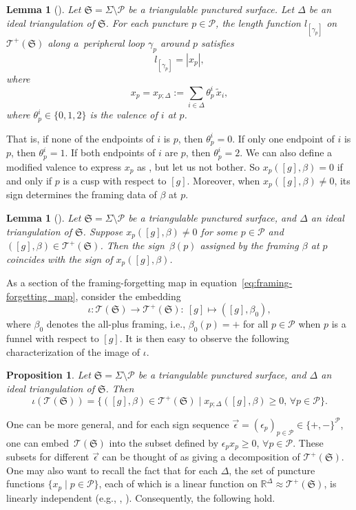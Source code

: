 \documentclass[pdftex]{sigma}
\numberwithin{equation}{section}
\newtheorem{Lemma}[Theorem]{Lemma}
\newtheorem{Proposition}[Theorem]{Proposition}
\theoremstyle{definition}
\newcommand{\til}[1]{\widetilde{#1}}
\begin{document}
\begin{Lemma}[\cite{CF, FG07}]
\label{lem:puncture_function_as_sum}
Let $\mathfrak{S} = \Sigma \setminus \mathcal{P}$ be a triangulable punctured surface. Let $\Delta$ be an ideal triangulation of $\mathfrak{S}$. For each puncture $p \in \mathcal{P}$, the length function $l_{[\gamma_p]}$ on $\mathscr{T}^+(\mathfrak{S})$ along a~peripheral loop $\gamma_p$ around $p$ satisfies
\[
l_{[\gamma_p]} = \left| x_p \right|,
\]
where
\[
x_p = x_{p;\Delta} := \sum_{i \in \Delta} \theta^i_p \, \til{x}_i,
\]
where $\theta_p^i \in \{0,1,2\}$ is the valence of $i$ at $p$.
\end{Lemma}
That is, if none of the endpoints of $i$ is $p$, then $\theta_p^i=0$. If only one endpoint of $i$ is $p$, then $\theta_p^i=1$. If both endpoints of $i$ are $p$, then $\theta_p^i=2$. We can also define a modified valence \smash{$\til{\theta}^i_p$} to express $x_p$ as \smash{$\sum_{i\in \Delta} \til{\theta}^i_p \, x_i$}, but let us not bother. So $x_p([g],\beta) =0$ if and only if $p$ is a cusp with respect to $[g]$. Moreover, when $x_p([g],\beta) \neq 0$, its sign determines the framing data of $\beta$ at $p$.
\begin{Lemma}[\cite{CF,FG07}]
Let $\mathfrak{S} = \Sigma \setminus \mathcal{P}$ be a triangulable punctured surface, and $\Delta$ an ideal triangulation of $\mathfrak{S}$. Suppose $x_p([g],\beta) \neq 0$ for some $p\in \mathcal{P}$ and $([g],\beta) \in \mathscr{T}^+(\mathfrak{S})$. Then the sign~$\beta(p)$ assigned by the framing $\beta$ at $p$ coincides with the sign of $x_p([g],\beta)$.
\end{Lemma}
As a section of the framing-forgetting map in equation~\eqref{eq:framing-forgetting_map}, consider the embedding
\[
\iota \colon \mathscr{T}(\mathfrak{S}) \to \mathscr{T}^+(\mathfrak{S}) \colon \ [g] \mapsto ([g], \beta_0),
\]
where $\beta_0$ denotes the all-plus framing, i.e., $\beta_0(p)=+$ for all $p \in \mathcal{P}$ when $p$ is a funnel with respect to $[g]$. It is then easy to observe the following characterization of the image of $\iota$.
\begin{Proposition}
Let $\mathfrak{S} = \Sigma \setminus \mathcal{P}$ be a triangulable punctured surface, and $\Delta$ an ideal triangulation of $\mathfrak{S}$. Then
\[
\iota(\mathscr{T}(\mathfrak{S})) = \{ ([g],\beta) \in \mathscr{T}^+(\mathfrak{S}) \mid x_{p;\Delta}([g],\beta) \ge 0, \, \forall p \in \mathcal{P} \}.
\]
\end{Proposition}
One can be more general, and for each sign sequence $\vec{\epsilon} = (\epsilon_p)_{p \in \mathcal{P}} \in \{+,-\}^\mathcal{P}$, one can embed~$\mathscr{T}(\mathfrak{S})$ into the subset defined by $\epsilon_p x_p \ge 0$, $\forall p \in \mathcal{P}$. These subsets for different $\vec{\epsilon}$ can be thought of as giving a decomposition of $\mathscr{T}^+(\mathfrak{S})$. One may also want to recall the fact that for each $\Delta$, the set of puncture functions $\{ x_p \mid p \in \mathcal{P} \}$, each of which is a linear function on $\mathbb{R}^\Delta \approx \mathscr{T}^+(\mathfrak{S})$, is linearly independent (e.g., \cite[Lemma~8]{BL07}, \cite[Lemma~3.2]{Kim_irreducible}). Consequently, the following hold.
\end{document}
